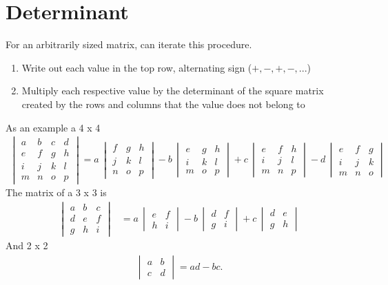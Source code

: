 \section{Determinant}
For an arbitrarily sized matrix, can iterate this procedure.
\begin{enumerate}
\item Write out each value in the top row, alternating sign ($+,-,+,-,...$)
\item Multiply each respective value by the determinant of the square matrix created by the rows and columns that the value does not belong to
\end{enumerate}
As an example a 4 x 4
\begin{align}
\begin{vmatrix} a & b & c & d\\e & f & g & h\\i & j & k & l\\m & n & o & p \end{vmatrix}=a\,\begin{vmatrix} f & g & h\\j & k & l\\n & o & p \end{vmatrix}-b\,\begin{vmatrix} e & g & h\\i & k & l\\m & o & p \end{vmatrix}+c\,\begin{vmatrix} e & f & h\\i & j & l\\m & n & p \end{vmatrix}-d\,\begin{vmatrix} e & f & g\\i & j & k\\m & n & o \end{vmatrix}
\end{align}
The matrix of a 3 x 3 is 
\begin{align}
 \begin{vmatrix} a & b & c\\d & e & f\\g & h & i \end{vmatrix} &= a\,\begin{vmatrix} e & f\\h & i \end{vmatrix} - b\,\begin{vmatrix} d & f\\g & i \end{vmatrix} + c\,\begin{vmatrix} d & e\\g & h \end{vmatrix}\end{align}
 And 2 x 2
 \begin{align}\begin{vmatrix} a & b\\c & d \end{vmatrix}=ad - bc .\end{align}

